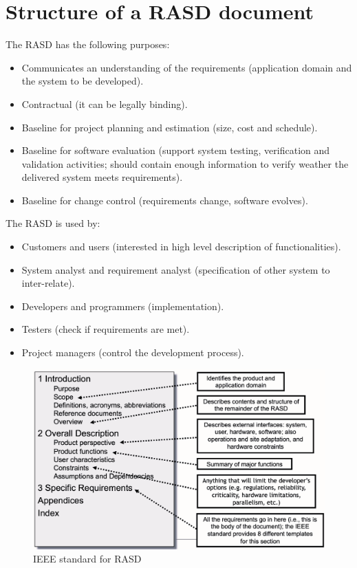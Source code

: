\documentclass[12pt, a4paper]{report}
\begin{document}
    \section{Structure of a RASD document}
        The RASD has the following purposes: 
        \begin{itemize}
            \item Communicates an understanding of the requirements (application domain and the system to be developed).
            \item Contractual (it can be legally binding).
            \item Baseline for project planning and estimation (size, cost and schedule).
            \item Baseline for software evaluation (support system testing, verification and validation activities; should contain enough information to verify weather the delivered system meets requirements).
            \item Baseline for change control (requirements change, software evolves).
        \end{itemize}
        The RASD is used by:
        \begin{itemize}
            \item Customers and users (interested in high level description of functionalities).
            \item System analyst and requirement analyst (specification of other system to inter-relate).
            \item Developers and programmers (implementation).
            \item Testers (check if requirements are met).
            \item Project managers (control the development process).
        \end{itemize}
        \begin{figure}
            \centering
            \includegraphics[width=1\linewidth]{images/RASD.png}
            \caption{IEEE standard for RASD}
        \end{figure}
\end{document}
